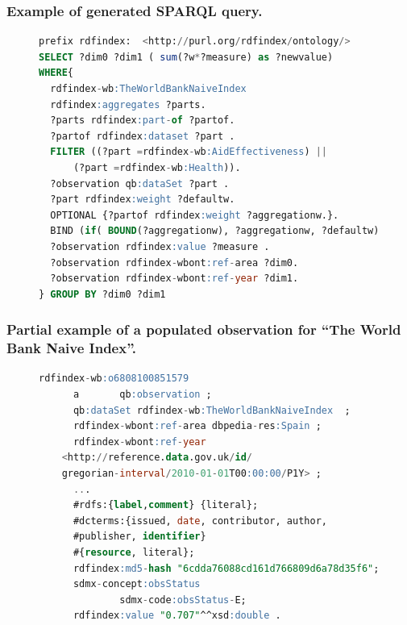 \documentclass[xcolor=dvipsnames,dvip,notes=show,table]{beamer}
\begin{document}
\begin{frame}[fragile]
\frametitle{Example of generated SPARQL query.}
\begin{figure}[!ht]
\begin{lstlisting}[language=SQL,basicstyle=\scriptsize]  
prefix rdfindex:  <http://purl.org/rdfindex/ontology/> 
SELECT ?dim0 ?dim1 ( sum(?w*?measure) as ?newvalue) 
WHERE{ 
  rdfindex-wb:TheWorldBankNaiveIndex  
  rdfindex:aggregates ?parts.
  ?parts rdfindex:part-of ?partof.
  ?partof rdfindex:dataset ?part .
  FILTER ((?part =rdfindex-wb:AidEffectiveness) || 
	  (?part =rdfindex-wb:Health)). 
  ?observation qb:dataSet ?part . 
  ?part rdfindex:weight ?defaultw.        
  OPTIONAL {?partof rdfindex:weight ?aggregationw.}.
  BIND (if( BOUND(?aggregationw), ?aggregationw, ?defaultw) AS ?w)
  ?observation rdfindex:value ?measure . 
  ?observation rdfindex-wbont:ref-area ?dim0. 
  ?observation rdfindex-wbont:ref-year ?dim1. 
} GROUP BY ?dim0 ?dim1 
\end{lstlisting}
 
\end{figure}
\end{frame}




\begin{frame}[fragile]
\frametitle{Partial example of a populated observation for ``The World Bank Naive Index''.}
\begin{figure}[!ht]
\begin{lstlisting}[language=SQL,basicstyle=\scriptsize]  
rdfindex-wb:o6808100851579
      a       qb:observation ;
      qb:dataSet rdfindex-wb:TheWorldBankNaiveIndex  ;
      rdfindex-wbont:ref-area dbpedia-res:Spain ;
      rdfindex-wbont:ref-year
	<http://reference.data.gov.uk/id/
	gregorian-interval/2010-01-01T00:00:00/P1Y> ;
      ...
      #rdfs:{label,comment} {literal};
      #dcterms:{issued, date, contributor, author, 
      #publisher, identifier} 
      #{resource, literal};
      rdfindex:md5-hash "6cdda76088cd161d766809d6a78d35f6";
      sdmx-concept:obsStatus
              sdmx-code:obsStatus-E;
      rdfindex:value "0.707"^^xsd:double .
\end{lstlisting}
 
\end{figure}
\end{frame}





\end{document}
